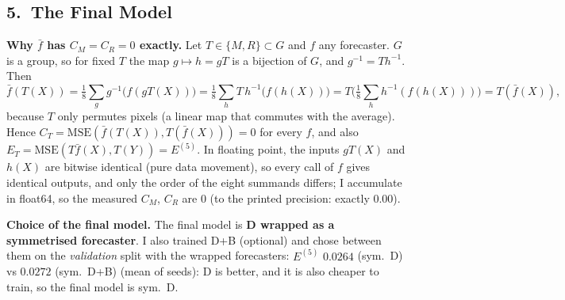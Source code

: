 
\subsection*{5.\ The Final Model}
\textbf{Why $\bar f$ has $C_M=C_R=0$ exactly.} Let $T\in\{M,R\}\subset G$ and $f$ any forecaster. $G$ is a group, so for fixed $T$ the map $g\mapsto h=gT$ is a bijection of $G$, and $g^{-1}=Th^{-1}$. Then
\[
\bar f(T(X))=\tfrac18\sum_{g}g^{-1}\big(f(gT(X))\big)=\tfrac18\sum_{h}T\,h^{-1}\big(f(h(X))\big)=T\Big(\tfrac18\sum_{h}h^{-1}(f(h(X)))\Big)=T(\bar f(X)),
\]
because $T$ only permutes pixels (a linear map that commutes with the average). Hence $C_T=\mathrm{MSE}(\bar f(T(X)),T(\bar f(X)))=0$ for every $f$, and also $E_T=\mathrm{MSE}(T\bar f(X),T(Y))=E^{(5)}$. In floating point, the inputs $gT(X)$ and $h(X)$ are bitwise identical (pure data movement), so every call of $f$ gives identical outputs, and only the order of the eight summands differs; I accumulate in float64, so the measured $C_M$, $C_R$ are $0$ (to the printed precision: exactly $0.00$).

\textbf{Choice of the final model.} The final model is \textbf{D wrapped as a symmetrised forecaster}. I also trained D+B (optional) and chose between them on the \emph{validation} split with the wrapped forecasters: $E^{(5)}$ $0.0264$ (sym.\ D) vs $0.0272$ (sym.\ D+B) (mean of seeds): D is better, and it is also cheaper to train, so the final model is sym.\ D.

